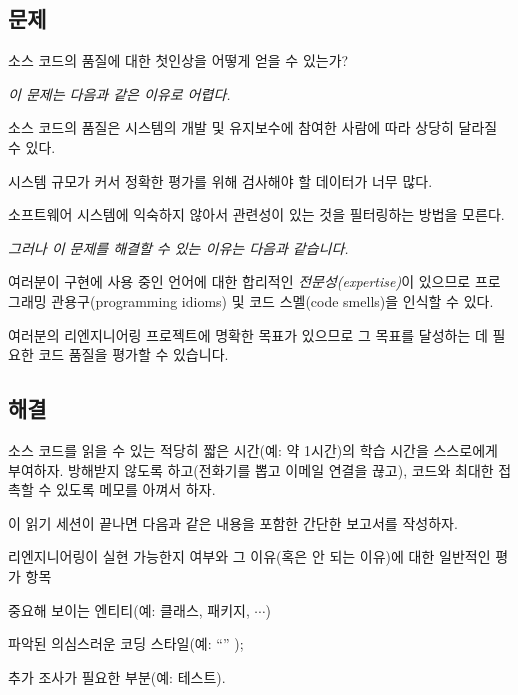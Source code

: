 \documentclass[a4paper,10pt,twoside]{book}
\begin{document}


\subsection*{문제}

소스 코드의 품질에 대한 첫인상을 어떻게 얻을 수 있는가?

\emph{이 문제는 다음과 같은 이유로 어렵다.}

\begin{bulletlist}
  \item 소스 코드의 품질은 시스템의 개발 및 유지보수에 참여한 사람에 따라 상당히 달라질 수 있다.

  \item 시스템 규모가 커서 정확한 평가를 위해 검사해야 할 데이터가 너무 많다.

  \item 소프트웨어 시스템에 익숙하지 않아서 관련성이 있는 것을 필터링하는 방법을 모른다.
\end{bulletlist}

\emph{그러나 이 문제를 해결할 수 있는 이유는 다음과 같습니다.}

\begin{bulletlist}
  \item 여러분이 구현에 사용 중인 언어에 대한 합리적인 \emph{전문성(expertise)}이 있으므로 프로그래밍 관용구(programming idioms) 및 코드 스멜(code smells)을 인식할 수 있다.

  \item 여러분의 리엔지니어링 프로젝트에 명확한 목표가 있으므로 그 목표를 달성하는 데 필요한 코드 품질을 평가할 수 있습니다.

\end{bulletlist}

\subsection*{해결}

소스 코드를 읽을 수 있는 적당히 짧은 시간(예: 약 1시간)의 학습 시간을 스스로에게 부여하자. 방해받지 않도록 하고(전화기를 뽑고 이메일 연결을 끊고), 코드와 최대한 접촉할 수 있도록 메모를 아껴서 하자. 

이 읽기 세션이 끝나면 다음과 같은 내용을 포함한 간단한 보고서를 작성하자.
\begin{bulletlist}
  \item 리엔지니어링이 실현 가능한지 여부와 그 이유(혹은 안 되는 이유)에 대한 일반적인 평가 항목

  \item 중요해 보이는 엔티티(예: 클래스, 패키지, $\cdots$)

  \item 파악된 의심스러운 코딩 스타일(예: ``'' \cite{Fowl99a});

  \item 추가 조사가 필요한 부분(예: 테스트).

\end{bulletlist}
\end{document}
